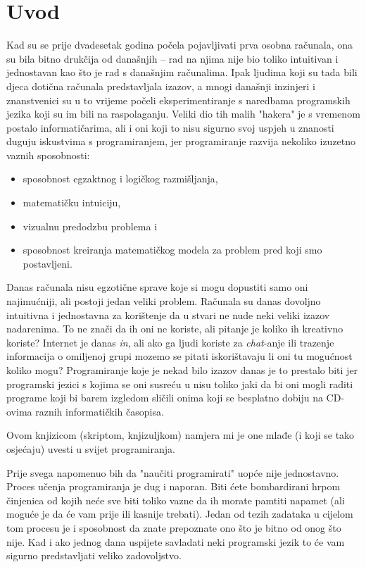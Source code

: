 \chapter*{Uvod}

Kad su se prije dvadesetak godina počela pojavljivati prva osobna računala, ona
su bila bitno drukčija od današnjih -- rad na njima nije bio toliko intuitivan i
jednostavan kao što je rad s današnjim računalima. Ipak ljudima koji su tada
bili djeca dotična računala predstavljala izazov, a mnogi današnji
inzinjeri i znanstvenici su u to vrijeme počeli eksperimentiranje s naredbama
programskih jezika koji su im bili na raspolaganju. Veliki dio tih malih "hakera" je s
vremenom postalo informatičarima, ali i oni koji to nisu sigurno svoj uspjeh u
znanosti duguju iskustvima s programiranjem, jer programiranje razvija nekoliko
izuzetno vaznih sposobnosti:

\begin{itemize}
   \item sposobnost egzaktnog i logičkog razmišljanja,
   \item matematičku intuiciju,
   \item vizualnu predodzbu problema i
   \item sposobnost kreiranja matematičkog modela za problem pred koji smo
   posta\-vlje\-ni.
\end{itemize}

Danas računala nisu egzotične sprave koje si mogu dopustiti samo oni
najimućniji, ali postoji jedan veliki problem.
Računala su danas dovoljno intuitivna i jednostavna za korištenje da u stvari ne
nude neki veliki izazov nadarenima. To ne znači da ih oni ne koriste, ali
pitanje je koliko ih kreativno koriste? Internet je danas \emph{in}, ali ako ga ljudi
koriste za \emph{chat}-anje ili trazenje informacija o omiljenoj grupi mozemo se
pitati iskorištavaju li oni tu mogu\'cnost koliko mogu? Programiranje koje je nekad
bilo izazov danas je to prestalo biti jer programski jezici s kojima se oni susreću
u nisu toliko jaki da bi oni mogli raditi programe koji bi barem izgledom sličili
onima koji se besplatno dobiju na CD-ovima raznih informatičkih časopisa.

Ovom knjizicom (skriptom, knjizuljkom) namjera mi je one mlađe (i koji se
tako osjećaju)
uvesti u svijet programiranja. 

Prije svega napomenuo bih da "naučiti programirati" uopće nije jednostavno.
Proces učenja programiranja
je dug i naporan. Biti ćete bombardirani hrpom činjenica od kojih neće sve
biti toliko vazne da ih morate pamtiti napamet (ali moguće je da će vam
prije ili kasnije trebati). Jedan od tezih zadataka u cijelom tom procesu je i
sposobnost da znate prepoznate ono što je bitno od onog što nije.
Kad i ako jednog dana uspijete savladati neki programski jezik to će vam
sigurno predstavljati veliko zadovoljstvo.

